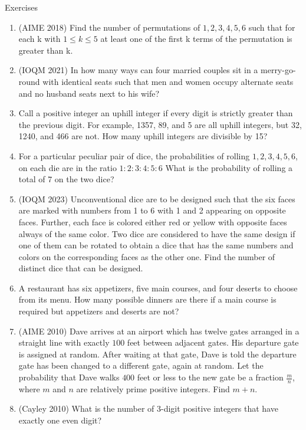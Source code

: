 \begin{xcb}{Exercises}
\begin{enumerate}
\item (AIME 2018) Find the number of permutations of $1, 2, 3, 4, 5, 6$ such that for each k with $1 \leq k \leq 5$ at least one of the first k terms of the permutation is greater than k.
\item (IOQM 2021) In how many ways can four married couples sit in a merry-go-round with identical seats such that men and women occupy alternate seats and no husband seats next to his wife?
\item Call a positive integer an uphill integer if every digit is strictly greater than the previous digit. For example, 1357, 89, and 5 are all uphill integers, but 32, 1240, and 466 are not. How many uphill integers are divisible by 15?
\item For a particular peculiar pair of dice, the probabilities of rolling $1, 2, 3, 4, 5,6$, on each die are in the ratio $1 : 2 : 3 : 4 : 5 : 6$ What is the probability of rolling a total of 7 on the two dice?
\item (IOQM 2023) Unconventional dice are to be designed such that the six faces are marked with numbers from 1 to 6 with 1 and 2 appearing on opposite faces. Further, each face is colored either red or yellow with opposite faces always of the same color. Two dice are considered to have the same design if one of them can be rotated to obtain a dice that has the same numbers and colors on the corresponding faces as the other one. Find the number of distinct dice that can be designed.
\item A restaurant has six appetizers, five main courses, and four deserts to choose from its menu. How many possible dinners are there if a main course is required but appetizers and deserts are not?
\item (AIME 2010) Dave arrives at an airport which has twelve gates arranged in a straight line with exactly $100$ feet between adjacent gates. His departure gate is assigned at random. After waiting at that gate, Dave is told the departure gate has been changed to a different gate, again at random. Let the probability that Dave walks $400$ feet or less to the new gate be a fraction $\frac{m}{n}$, where $m$ and $n$ are relatively prime positive integers. Find $m+n$.
\item (Cayley 2010) What is the number of 3-digit positive integers that have exactly one even digit?
\end{enumerate}
\end{xcb}
